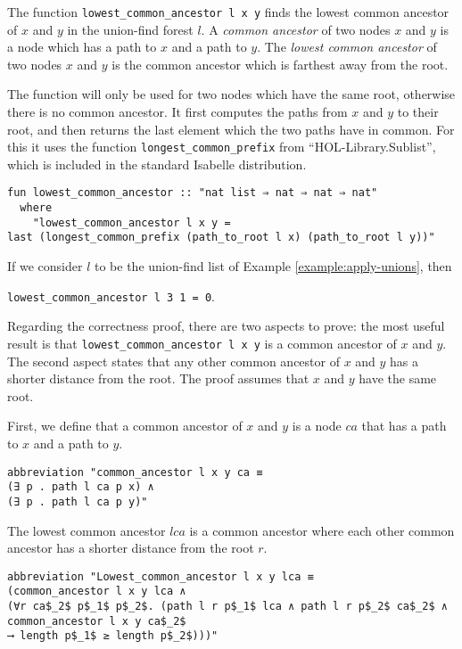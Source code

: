 The function \lstinline{lowest_common_ancestor l x y} finds the lowest common ancestor of $x$ and $y$ in the union-find forest $l$.
A \emph{common ancestor} of two nodes $x$ and $y$ is a node which has a path to $x$ and a path to $y$.
The \emph{lowest common ancestor} of two nodes $x$ and $y$ is the common ancestor which is farthest away from the root.

The function will only be used for two nodes which have the same root, otherwise there is no common ancestor. It first computes the paths from $x$ and $y$ to their root, and then returns the last element which the two paths have in common. For this it uses the function \lstinline{longest_common_prefix} from ``HOL-Library.Sublist'', which is included in the standard Isabelle distribution.

\begin{lstlisting}
fun lowest_common_ancestor :: "nat list ⇒ nat ⇒ nat ⇒ nat"
  where
    "lowest_common_ancestor l x y =
last (longest_common_prefix (path_to_root l x) (path_to_root l y))"
\end{lstlisting}

\begin{exmp}
If we consider $l$ to be the union-find list of Example \ref{example:apply-unions}, then

\lstinline|lowest_common_ancestor l 3 1 = 0|.
\end{exmp}

Regarding the correctness proof, there are two aspects to prove: the most useful result is that \lstinline{lowest_common_ancestor l x y} is a common ancestor of $x$ and $y$. The second aspect states that any other common ancestor of $x$ and $y$ has a shorter distance from the root. The proof assumes that $x$ and $y$ have the same root.

First, we define that a common ancestor of $x$ and $y$ is a node $ca$ that has a path to $x$ and a path to $y$.

\begin{lstlisting}
abbreviation "common_ancestor l x y ca ≡
(∃ p . path l ca p x) ∧
(∃ p . path l ca p y)"
\end{lstlisting}

The lowest common ancestor $lca$ is a common ancestor where each other common ancestor has a shorter distance from the root $r$.

\begin{lstlisting}
abbreviation "Lowest_common_ancestor l x y lca ≡
(common_ancestor l x y lca ∧
(∀r ca$_2$ p$_1$ p$_2$. (path l r p$_1$ lca ∧ path l r p$_2$ ca$_2$ ∧ common_ancestor l x y ca$_2$
⟶ length p$_1$ ≥ length p$_2$)))"
\end{lstlisting}

